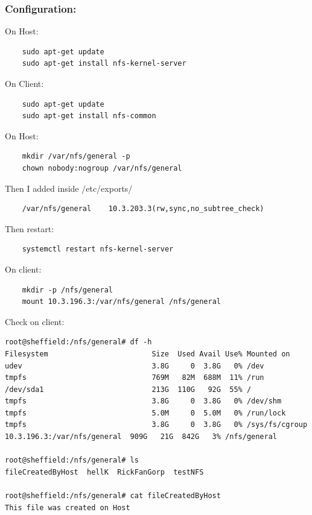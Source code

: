 \documentclass[10pt,a4paper]{article}
\begin{document}
\subsubsection{Configuration:}


On Host:

\begin{verbatim}
    sudo apt-get update
    sudo apt-get install nfs-kernel-server
\end{verbatim}

On Client:
\begin{verbatim}
    sudo apt-get update
    sudo apt-get install nfs-common
\end{verbatim}



On Host:

\begin{verbatim}
    mkdir /var/nfs/general -p
    chown nobody:nogroup /var/nfs/general
\end{verbatim}

Then I added inside /etc/exports/

\begin{verbatim}
    /var/nfs/general    10.3.203.3(rw,sync,no_subtree_check)
\end{verbatim}

Then restart:
\begin{verbatim}
    systemctl restart nfs-kernel-server
\end{verbatim}

On client:
\begin{verbatim}
    mkdir -p /nfs/general
    mount 10.3.196.3:/var/nfs/general /nfs/general
\end{verbatim}

Check on client:
\begin{verbatim}
root@sheffield:/nfs/general# df -h
Filesystem                        Size  Used Avail Use% Mounted on
udev                              3.8G     0  3.8G   0% /dev
tmpfs                             769M   82M  688M  11% /run
/dev/sda1                         213G  110G   92G  55% /
tmpfs                             3.8G     0  3.8G   0% /dev/shm
tmpfs                             5.0M     0  5.0M   0% /run/lock
tmpfs                             3.8G     0  3.8G   0% /sys/fs/cgroup
10.3.196.3:/var/nfs/general  909G   21G  842G   3% /nfs/general

root@sheffield:/nfs/general# ls
fileCreatedByHost  hellK  RickFanGorp  testNFS

root@sheffield:/nfs/general# cat fileCreatedByHost 
This file was created on Host

\end{verbatim}
\end{document}

